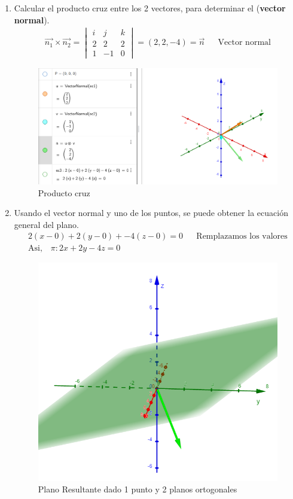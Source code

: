 \documentclass{templateNote}
\begin{document}
\begin{enumerate}
    \item Calcular el producto cruz entre los 2 vectores, para determinar el (\textbf{vector normal}).
    \begin{align*}
        \overrightarrow{n_1} \times \overrightarrow{n_2} =  \begin{vmatrix} i & j & k \\ 2 & 2 & 2 \\ 1 & -1 & 0\end{vmatrix} = (2, 2, -4)  = \overrightarrow{n}&& \text{Vector normal}
    \end{align*}

    \begin{figure}[H]
        \centering
        \includegraphics[width=0.8\linewidth]{img/ProductoVectorial.png}
        \caption{Producto cruz}
    \end{figure}
    \item Usando el vector normal y uno de los puntos, se puede obtener la ecuación general del plano.
    \begin{align*}
        2(x-0) + 2(y-0) + -4(z-0) = 0 && \text{Remplazamos los valores} \\
        \textrm{Asi,} \quad \pi: 2x + 2y - 4z = 0
    \end{align*}

    \begin{figure}[H]
        \centering
        \includegraphics[width=0.8\linewidth]{img/PlanoResultante.png}
        \caption{Plano Resultante dado 1 punto y 2 planos ortogonales}
    \end{figure}

\end{enumerate}
\end{document}
